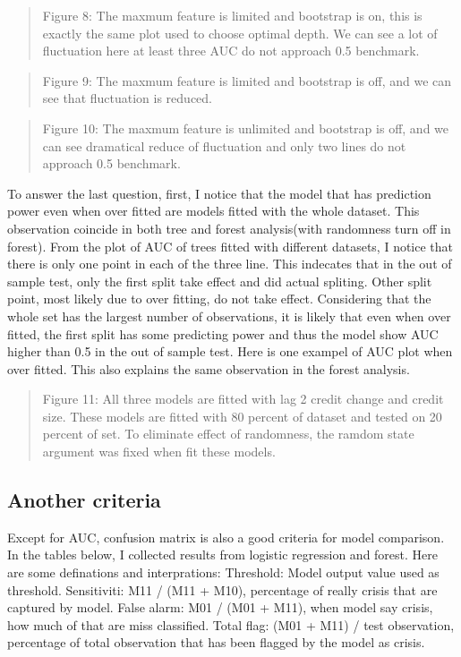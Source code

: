 \documentclass{article}
\begin{document}
\begin{quote}
Figure 8: The maxmum feature is limited and bootstrap is on, this is
exactly the same plot used to choose optimal depth. We can see a lot of
fluctuation here at least three AUC do not approach 0.5 benchmark.
\end{quote}

\begin{quote}
Figure 9: The maxmum feature is limited and bootstrap is off, and we can
see that fluctuation is reduced.
\end{quote}

\begin{quote}
Figure 10: The maxmum feature is unlimited and bootstrap is off, and we
can see dramatical reduce of fluctuation and only two lines do not
approach 0.5 benchmark.
\end{quote}

To answer the last question, first, I notice that the model that has
prediction power even when over fitted are models fitted with the whole
dataset. This observation coincide in both tree and forest analysis(with
randomness turn off in forest). From the plot of AUC of trees fitted
with different datasets, I notice that there is only one point in each
of the three line. This indecates that in the out of sample test, only
the first split take effect and did actual spliting. Other split point,
most likely due to over fitting, do not take effect. Considering that
the whole set has the largest number of observations, it is likely that
even when over fitted, the first split has some predicting power and
thus the model show AUC higher than 0.5 in the out of sample test. Here
is one exampel of AUC plot when over fitted. This also explains the same
observation in the forest analysis.

\begin{quote}
Figure 11: All three models are fitted with lag 2 credit change and
credit size. These models are fitted with 80 percent of dataset and
tested on 20 percent of set. To eliminate effect of randomness, the
ramdom state argument was fixed when fit these models.
\end{quote}

\subsection*{Another criteria}

Except for AUC, confusion matrix is also a good criteria for model
comparison. In the tables below, I collected results from logistic
regression and forest. Here are some definations and interprations:
Threshold: Model output value used as threshold. Sensitiviti: M11 / (M11
+ M10), percentage of really crisis that are captured by model. False
alarm: M01 / (M01 + M11), when model say crisis, how much of that are
miss classified. Total flag: (M01 + M11) / test observation, percentage
of total observation that has been flagged by the model as crisis.
\end{document}
